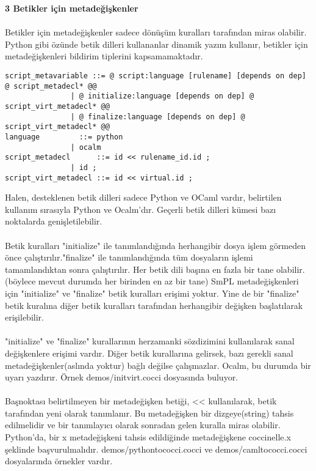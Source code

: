 \documentclass[a4paper,20pt, right=2cm]{article}
\begin{document}
\textbf{3 Betikler için metadeğişkenler}\\
\\
Betikler için metadeğişkenler sadece dönüşüm kuralları tarafından miras olabilir. Python gibi özünde betik dilleri kullananlar dinamik yazım kullanır, betikler için metadeğişkenleri bildirim tiplerini kapsamamaktadır.
\begin{lstlisting}[basicstyle=\small]
script_metavariable ::= @ script:language [rulename] [depends on dep] @ script_metadecl* @@
		       | @ initialize:language [depends on dep] @ script_virt_metadecl* @@
		       | @ finalize:language [depends on dep] @ script_virt_metadecl* @@
language	     ::= python
		       | ocalm
script_metadecl      ::= id << rulename_id.id ;
		       | id ;
script_virt_metadecl ::= id << virtual.id ;
\end{lstlisting}
Halen, desteklenen betik dilleri sadece  Python ve OCaml vardır, belirtilen kullanım sırasıyla Python ve Ocalm'dır. Geçerli betik dilleri kümesi bazı noktalarda genişletilebilir.\\ 
\\
Betik kuralları "initialize" ile tanımlandığında herhangibir dosya işlem görmeden önce çalıştırılır."finalize" ile tanımlandığında tüm dosyaların işlemi tamamlandıktan sonra çalıştırılır. Her betik dili başına en fazla bir tane olabilir. (böylece mevcut durumda her birinden en az bir tane) SmPL metadeğişkenleri için "initialize" ve "finalize" betik kuralları erişimi yoktur. Yine de bir "finalize" betik kuralına diğer betik kuralları tarafından herhangibir değişken başlatılarak erişilebilir.\\
\\    
"initialize" ve "finalize" kurallarının herzamanki sözdizimini kullanılarak sanal değişkenlere erişimi vardır. Diğer betik kurallarına gelirsek, bazı gerekli sanal metadeğişkenler(aslında yoktur) bağlı değilse çalışmazlar. Ocalm, bu durumda bir uyarı yazdırır. Örnek demos/initvirt.cocci dosyasında buluyor.\\
\\
Başnoktası belirtilmeyen bir metadeğişken betiği, << kullanılarak, betik tarafından yeni olarak tanımlanır. Bu metadeğişken bir dizgeye(string) tahsis edilmelidir ve bir tanımlayıcı olarak sonradan gelen kuralla miras olabilir. Python'da, bir x metadeğişkeni tahsis edildiğinde metadeğişkene coccinelle.x şeklinde başvurulmalıdır. demos/pythontococci.cocci ve demos/camltococci.cocci dosyalarında örnekler vardır.\\
\\
\end{document}
